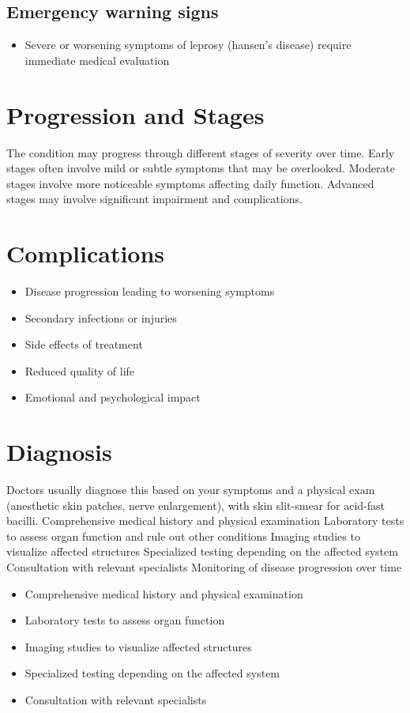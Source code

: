 \subsection{Emergency warning signs}
\begin{itemize}[noitemsep]
  \item Severe or worsening symptoms of leprosy (hansen's disease) require immediate medical evaluation
\end{itemize}
\section{Progression and Stages}
The condition may progress through different stages of severity over time. Early stages often involve mild or subtle symptoms that may be overlooked. Moderate stages involve more noticeable symptoms affecting daily function. Advanced stages may involve significant impairment and complications.
\section{Complications}
\begin{itemize}[noitemsep]
  \item Disease progression leading to worsening symptoms
  \item Secondary infections or injuries
  \item Side effects of treatment
  \item Reduced quality of life
  \item Emotional and psychological impact
\end{itemize}
\section{Diagnosis}
Doctors usually diagnose this based on your symptoms and a physical exam (anesthetic skin patches, nerve enlargement), with skin slit-smear for acid-fast bacilli. Comprehensive medical history and physical examination Laboratory tests to assess organ function and rule out other conditions Imaging studies to visualize affected structures Specialized testing depending on the affected system Consultation with relevant specialists Monitoring of disease progression over time

\begin{itemize}[noitemsep]
  \item Comprehensive medical history and physical examination
  \item Laboratory tests to assess organ function
  \item Imaging studies to visualize affected structures
  \item Specialized testing depending on the affected system
  \item Consultation with relevant specialists
\end{itemize}

